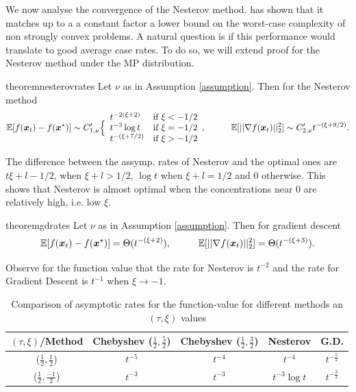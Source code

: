 \documentclass{article}
\begin{document}
We now analyse the convergence of the Nesterov method. \cite{nesterov2003introductory} has shown that it matches up to a a constant factor a lower bound on the worst-case complexity of non strongly convex problems. A natural question is if this performance would translate to good average case rates. To do so, we will extend \citet{paquette2020halting} proof for the Nesterov method under the MP distribution.  
\begin{restatable}{theorem}{nesterovrates} \label{the: neste rates}
Let $\nu$ as in Assumption \ref{assumption}. Then for the Nesterov method
\begin{equation}
    \mathbb{E}[f({\boldsymbol x}_t)-f({\boldsymbol x}^\star)]\sim C'_{1,\nu}
    \Big\{\begin{array}{ll}
		  t^{-2(\xi+2)}& \mbox{if } 
		  \xi<-1/2\\
		  t^{-3}\log t& \mbox{if } 
		  \xi=-1/2\\
		  t^{-(\xi+7/2)}& \mbox{if } 
		  \xi>-1/2
	\end{array}, \hspace{1 cm}
	\mathbb{E}[||\nabla f({\boldsymbol x}_t)||^2_2] \sim C'_{2,\nu}
		  t^{-(\xi+9/2)}.
\end{equation}
\end{restatable}

The difference between the assymp. rates of Nesterov and the optimal ones are $t{\xi+l-1/2}$, when $\xi+l>1/2$, $\log t$ when $\xi+l=1/2$ and $0$ otherwise.
This shows that Nesterov is almost optimal when the concentrations near $0$ are relatively high, i.e. low $\xi$.

\begin{restatable}{theorem}{gdrates} \label{the: gd rates}
Let $\nu$ as in Assumption \ref{assumption}. Then for gradient descent
\begin{equation}
\mathbb{E}[f({\boldsymbol x}_t)-f({\boldsymbol x}^\star)]=\Theta(t^{-(\xi+2)}), \hspace{1 cm}
	\mathbb{E}[||\nabla f({\boldsymbol x}_t)||^2_2] =\Theta(t^{-(\xi+3)}).
\end{equation}

\end{restatable}

Observe for the function value that the rate for Nesterov is $t^{-2}$ and the rate for Gradient Descent is $t^{-1}$ when $\xi \rightarrow -1$. 

\begin{table}[t]
    \centering
    \begin{tabular}{c|c|c|c|c}
         $(\tau,\xi)$/Method& Chebyshev ($\frac{1}{2},\frac{5}{2}$) & Chebyshev ($\frac{1}{2},\frac{3}{2}$) &  Nesterov  & G.D. \\
         \hline
         ($\frac{1}{2},\frac{1}{2}$)&$t^{-5}$ & $t^{-4}$ & $t^{-4}$ & $t^{-\frac{5}{2}}$\\
         \hline
         ($\frac{1}{2},\frac{-1}{2}$)&$t^{-3}$ & $t^{-3}$ & $t^{-3}\log t$ & $t^{-\frac{3}{2}}$
    \end{tabular}
    \caption{Comparison of asymptotic rates for the function-value for different methods an $(\tau,\xi)$ values}
    \label{tab:theoretic rates}
\end{table}
\end{document}
